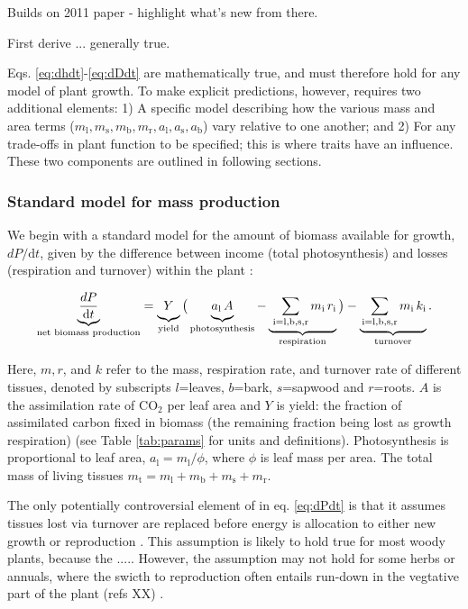 \documentclass[12pt, a4paper]{article}
\begin{document}
Builds on 2011 paper - highlight what's new from there.

First derive ... generally true.

Eqs. \ref{eq:dhdt}-\ref{eq:dDdt} are mathematically true, and must
therefore hold for any model of plant growth. To make explicit
predictions, however, requires two additional elements: 1) A specific
model describing how the various mass and area terms
($m_\textrm{l}, m_\textrm{s}, m_\textrm{b}, m_\textrm{r}, a_\textrm{l}, a_\textrm{s}, a_\textrm{b}$)
vary relative to one another; and 2) For any trade-offs in plant
function to be specified; this is where traits have an influence.  These two components are outlined in following sections.

\subsubsection{Standard model for mass production}

We begin with a standard model for the amount of biomass available for
growth, $dP / \textrm{d}t$, given by the difference between income
(total photosynthesis) and losses (respiration and turnover) within the
plant \citep{makela-1997, Thornley-2000, falster-2011}:

\begin{equation}\label{eq:dPdt}
\underbrace{\strut \frac{dP}{\textrm{d}t}}_\textrm{net biomass production}
  = \underbrace{\strut Y}_\textrm{yield}
    \big( \underbrace{\strut a_\textrm{l} \, A}_\textrm{photosynthesis} -
     \underbrace{\strut \,\sum_\textrm{i=l,b,s,r}{m_\textrm{i} \, r_\textrm{i}}}_\textrm{respiration}\big)
    - \underbrace{\strut \sum_\textrm{i=l,b,s,r}{m_\textrm{i} \, k_\textrm{i}}}_\textrm{turnover}.
\end{equation}

Here, $m,r$, and $k$ refer to the mass, respiration rate, and
turnover rate of different tissues, denoted by subscripts $l$=leaves,
$b$=bark, $s$=sapwood and $r$=roots. $A$ is the assimilation
rate of CO$_2$ per leaf area and $Y$ is yield: the fraction of
assimilated carbon fixed in biomass (the remaining fraction being lost
as growth respiration) (see Table \ref{tab:params} for units and
definitions). Photosynthesis is proportional to leaf area,
$a_\textrm{l} = m_\textrm{l} / \phi$, where $\phi$ is leaf mass per area.
The total mass of living tissues $m_\textrm{t}=m_\textrm{l}+m_\textrm{b}+m_\textrm{s}+m_\textrm{r}.$

The only potentially controversial element of in eq. \ref{eq:dPdt} is that it assumes tissues lost via turnover are replaced before energy is allocation to either new growth or reproduction \citep{Thornley-2000}. This assumption is likely to hold true for most woody plants, because the ..... However, the assumption may not hold for some herbs or annuals, where the swicth to reproduction often entails run-down in the vegtative part of the plant (refs XX) \citep{ Thornley-2000}.
\end{document}
